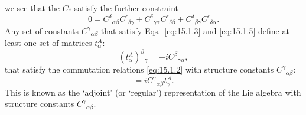 we see that the $C$s satisfy the further constraint
\begin{equation}
 0=C^\delta{}_{\alpha\beta}C^\epsilon{}_{\delta\gamma}
  +C^\delta{}_{\gamma\alpha}C^\epsilon{}_{\delta\beta}
  +C^\delta{}_{\beta\gamma}C^\epsilon{}_{\delta\alpha} .
 \tag{15.1.5}\label{eq:15.1.5}
\end{equation}
Any set of constants $C^\gamma{}_{\alpha\beta}$ that satisfy
Eqs.~\eqref{eq:15.1.3} and \eqref{eq:15.1.5} define at least one set of matrices
$t^A_\alpha$:
\begin{equation}
 (t^A_\alpha)^\beta{}_\gamma=-iC^\beta{}_{\gamma\alpha} ,
 \tag{15.1.6}\label{eq:15.1.6}
\end{equation}
that satisfy the commutation relations \eqref{eq:15.1.2} with structure constants
$C^\gamma{}_{\alpha\beta}$:
\begin{equation}
 [t^A_\alpha,t^A_\beta]=iC^\gamma{}_{\alpha\beta}t^A_\gamma .
 \tag{15.1.7}\label{eq:15.1.7}
\end{equation}
This is known as the `adjoint' (or `regular') representation of the Lie algebra
with structure constants $C^\gamma{}_{\alpha\beta}$.

